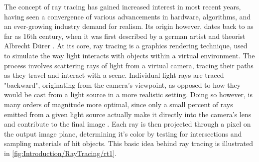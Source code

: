 The concept of ray tracing has gained increased interest in most recent years, having seen a convergence of various advancements in hardware, algorithms, and an ever-growing industry demand for realism.
Its origin however, dates back to as far as 16th century, when it was first described by a german artist and theorist Albrecht Dürer \supercite{Hofmann1990}.
At its core, ray tracing is a graphics rendering technique, used to simulate the way light interacts with objects within a virtual environment. 
The process involves scattering rays of light from a virtual camera, tracing their paths as they travel and interact with a scene. 
Individual light rays are traced "backward", originating from the camera's viewpoint, as opposed to how they would be cast from a light source in a more realistic setting.
Doing so however, is many orders of magnitude more optimal, since only a small percent of rays emitted from a given light source actually make it directly into the camera's lens and contribute to the final image \supercite{Glassner1989}.
Each ray is then projected through a pixel on the output image plane, determining it's color by testing for intersections and sampling materials of hit objects.
This basic idea behind ray tracing is illustrated in \cref{fig:Introduction/RayTracing/rt1}. 

